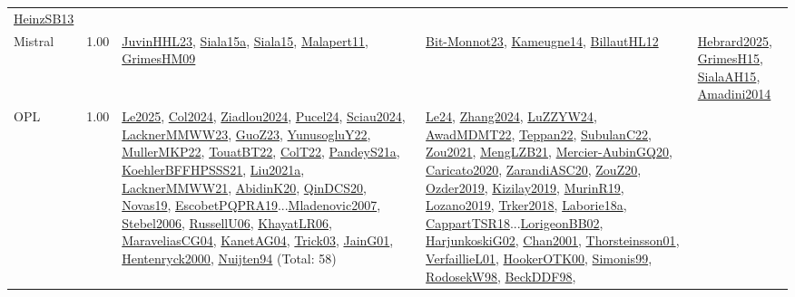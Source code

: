 {\begin{longtable}{p{3cm}r>{\raggedright\arraybackslash}p{6cm}>{\raggedright\arraybackslash}p{6cm}>{\raggedright\arraybackslash}p{8cm}}
\hyperref[detail:HeinzSB13]{HeinzSB13}\\
\index{Mistral}\index{CPSystems!Mistral}Mistral &  1.00 & \hyperref[detail:JuvinHHL23]{JuvinHHL23}, \hyperref[detail:Siala15a]{Siala15a}, \hyperref[detail:Siala15]{Siala15}, \hyperref[detail:Malapert11]{Malapert11}, \hyperref[detail:GrimesHM09]{GrimesHM09} & \hyperref[detail:Bit-Monnot23]{Bit-Monnot23}, \hyperref[detail:Kameugne14]{Kameugne14}, \hyperref[detail:BillautHL12]{BillautHL12} & \hyperref[detail:Hebrard2025]{Hebrard2025}, \hyperref[detail:GrimesH15]{GrimesH15}, \hyperref[detail:SialaAH15]{SialaAH15}, \hyperref[detail:Amadini2014]{Amadini2014}\\
\index{OPL}\index{CPSystems!OPL}OPL &  1.00 & \hyperref[detail:Le2025]{Le2025}, \hyperref[detail:Col2024]{Col2024}, \hyperref[detail:Ziadlou2024]{Ziadlou2024}, \hyperref[detail:Pucel24]{Pucel24}, \hyperref[detail:Sciau2024]{Sciau2024}, \hyperref[detail:LacknerMMWW23]{LacknerMMWW23}, \hyperref[detail:GuoZ23]{GuoZ23}, \hyperref[detail:YunusogluY22]{YunusogluY22}, \hyperref[detail:MullerMKP22]{MullerMKP22}, \hyperref[detail:TouatBT22]{TouatBT22}, \hyperref[detail:ColT22]{ColT22}, \hyperref[detail:PandeyS21a]{PandeyS21a}, \hyperref[detail:KoehlerBFFHPSSS21]{KoehlerBFFHPSSS21}, \hyperref[detail:Liu2021a]{Liu2021a}, \hyperref[detail:LacknerMMWW21]{LacknerMMWW21}, \hyperref[detail:AbidinK20]{AbidinK20}, \hyperref[detail:QinDCS20]{QinDCS20}, \hyperref[detail:Novas19]{Novas19}, \hyperref[detail:EscobetPQPRA19]{EscobetPQPRA19}...\hyperref[detail:Mladenovic2007]{Mladenovic2007}, \hyperref[detail:Stebel2006]{Stebel2006}, \hyperref[detail:RussellU06]{RussellU06}, \hyperref[detail:KhayatLR06]{KhayatLR06}, \hyperref[detail:MaraveliasCG04]{MaraveliasCG04}, \hyperref[detail:KanetAG04]{KanetAG04}, \hyperref[detail:Trick03]{Trick03}, \hyperref[detail:JainG01]{JainG01}, \hyperref[detail:Hentenryck2000]{Hentenryck2000}, \hyperref[detail:Nuijten94]{Nuijten94} (Total: 58) & \hyperref[detail:Le24]{Le24}, \hyperref[detail:Zhang2024]{Zhang2024}, \hyperref[detail:LuZZYW24]{LuZZYW24}, \hyperref[detail:AwadMDMT22]{AwadMDMT22}, \hyperref[detail:Teppan22]{Teppan22}, \hyperref[detail:SubulanC22]{SubulanC22}, \hyperref[detail:Zou2021]{Zou2021}, \hyperref[detail:MengLZB21]{MengLZB21}, \hyperref[detail:Mercier-AubinGQ20]{Mercier-AubinGQ20}, \hyperref[detail:Caricato2020]{Caricato2020}, \hyperref[detail:ZarandiASC20]{ZarandiASC20}, \hyperref[detail:ZouZ20]{ZouZ20}, \hyperref[detail:Ozder2019]{Ozder2019}, \hyperref[detail:Kizilay2019]{Kizilay2019}, \hyperref[detail:MurinR19]{MurinR19}, \hyperref[detail:Lozano2019]{Lozano2019}, \hyperref[detail:Trker2018]{Trker2018}, \hyperref[detail:Laborie18a]{Laborie18a}, \hyperref[detail:CappartTSR18]{CappartTSR18}...\hyperref[detail:LorigeonBB02]{LorigeonBB02}, \hyperref[detail:HarjunkoskiG02]{HarjunkoskiG02}, \hyperref[detail:Chan2001]{Chan2001}, \hyperref[detail:Thorsteinsson01]{Thorsteinsson01}, \hyperref[detail:VerfaillieL01]{VerfaillieL01}, \hyperref[detail:HookerOTK00]{HookerOTK00}, \hyperref[detail:Simonis99]{Simonis99}, \hyperref[detail:RodosekW98]{RodosekW98}, \hyperref[detail:BeckDDF98]{BeckDDF98}, 
\end{longtable}}
